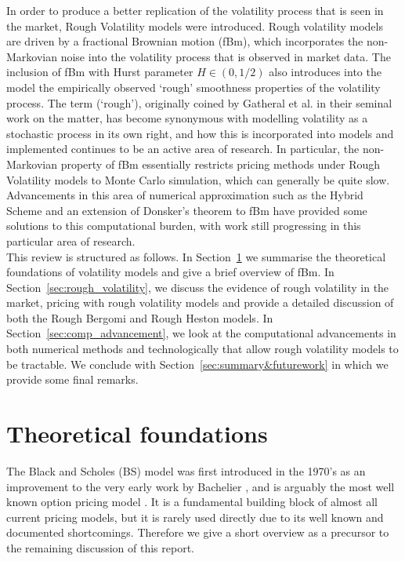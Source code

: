 \documentclass[12pt,oneside]{article}
\begin{document}
In order to produce a better replication of the volatility process that is seen in the market, Rough Volatility models were introduced. Rough volatility models are driven by a fractional Brownian motion (fBm), which incorporates the non-Markovian noise into the volatility process that is observed in market data. The inclusion of fBm with Hurst parameter $H\in(0,1/2)$ also introduces into the model the empirically observed `rough' smoothness properties of the volatility process. %
The term (`rough'), originally coined by Gatheral et al.\cite{Gatheral2014} in their seminal work on the matter, has become synonymous with modelling volatility as a stochastic process in its own right, and how this is incorporated into models and implemented continues to be an active area of research. In particular, the non-Markovian property of fBm essentially restricts pricing methods under Rough Volatility models to Monte Carlo simulation, which can generally be quite slow. Advancements in this area of numerical approximation such as the Hybrid Scheme \cite{Bennedsen2017} and an extension of Donsker's theorem to fBm \cite{Horvath2017} have provided some solutions to this computational burden, with work still progressing in this particular area of research.
\\

This review is structured as follows. In Section~\ref{sec:black_scholes_foundations} we summarise the theoretical foundations of volatility models and give a brief overview of fBm. In Section~\ref{sec:rough_volatility}, we discuss the evidence of rough volatility in the market, pricing with rough volatility models and provide a detailed discussion of both the Rough Bergomi and Rough Heston models. In Section~\ref{sec:comp_advancement}, we look at the computational advancements in both numerical methods and technologically that allow rough volatility models to be tractable. We conclude with Section~\ref{sec:summary&futurework} in which we provide some final remarks.

\section{Theoretical foundations}
\label{sec:black_scholes_foundations}

The Black and Scholes (BS) model was first introduced in the 1970's as an improvement to the very early work by Bachelier \cite{Bachelier1900}, and is arguably the most well known option pricing model \cite{BlackScholes1973}. It is a fundamental building block of almost all current pricing models, but it is rarely used directly due to its well known and documented shortcomings. Therefore we give a short overview as a precursor to the remaining discussion of this report.
\\
\end{document}
